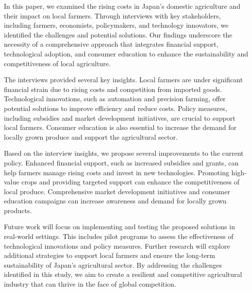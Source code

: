 \documentclass{article} %
\begin{document}
In this paper, we examined the rising costs in Japan's domestic agriculture and their impact on local farmers. Through interviews with key stakeholders, including farmers, economists, policymakers, and technology innovators, we identified the challenges and potential solutions. Our findings underscore the necessity of a comprehensive approach that integrates financial support, technological adoption, and consumer education to enhance the sustainability and competitiveness of local agriculture.

The interviews provided several key insights. Local farmers are under significant financial strain due to rising costs and competition from imported goods. Technological innovations, such as automation and precision farming, offer potential solutions to improve efficiency and reduce costs. Policy measures, including subsidies and market development initiatives, are crucial to support local farmers. Consumer education is also essential to increase the demand for locally grown produce and support the agricultural sector.

Based on the interview insights, we propose several improvements to the current policy. Enhanced financial support, such as increased subsidies and grants, can help farmers manage rising costs and invest in new technologies. Promoting high-value crops and providing targeted support can enhance the competitiveness of local produce. Comprehensive market development initiatives and consumer education campaigns can increase awareness and demand for locally grown products.

Future work will focus on implementing and testing the proposed solutions in real-world settings. This includes pilot programs to assess the effectiveness of technological innovations and policy measures. Further research will explore additional strategies to support local farmers and ensure the long-term sustainability of Japan's agricultural sector. By addressing the challenges identified in this study, we aim to create a resilient and competitive agricultural industry that can thrive in the face of global competition.



\end{document}

